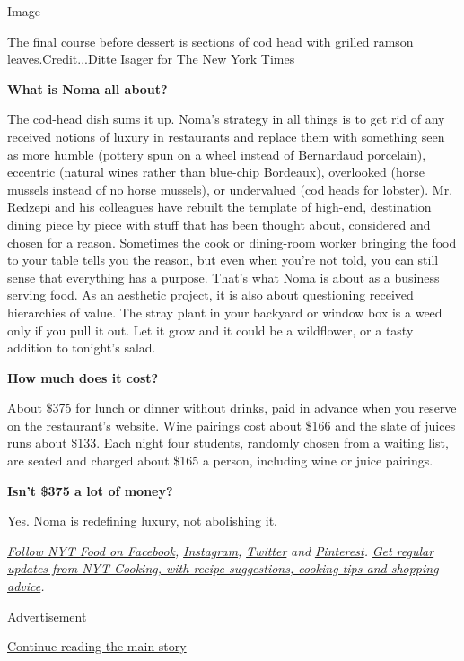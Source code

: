 Image

The final course before dessert is sections of cod head with grilled
ramson leaves.Credit...Ditte Isager for The New York Times

\textbf{What is Noma all about?}

The cod-head dish sums it up. Noma's strategy in all things is to get
rid of any received notions of luxury in restaurants and replace them
with something seen as more humble (pottery spun on a wheel instead of
Bernardaud porcelain), eccentric (natural wines rather than blue-chip
Bordeaux), overlooked (horse mussels instead of no horse mussels), or
undervalued (cod heads for lobster). Mr. Redzepi and his colleagues have
rebuilt the template of high-end, destination dining piece by piece with
stuff that has been thought about, considered and chosen for a reason.
Sometimes the cook or dining-room worker bringing the food to your table
tells you the reason, but even when you're not told, you can still sense
that everything has a purpose. That's what Noma is about as a business
serving food. As an aesthetic project, it is also about questioning
received hierarchies of value. The stray plant in your backyard or
window box is a weed only if you pull it out. Let it grow and it could
be a wildflower, or a tasty addition to tonight's salad.

\textbf{How much does it cost?}

About \$375 for lunch or dinner without drinks, paid in advance when you
reserve on the restaurant's website. Wine pairings cost about \$166 and
the slate of juices runs about \$133. Each night four students, randomly
chosen from a waiting list, are seated and charged about \$165 a person,
including wine or juice pairings.

\textbf{Isn't \$375 a lot of money?}

Yes. Noma is redefining luxury, not abolishing it.

\href{https://www.facebookcorewwwi.onion/nytfood/}{\emph{Follow NYT Food
on Facebook}}\emph{,}
\href{https://instagram.com/nytfood}{\emph{Instagram}}\emph{,}
\href{https://twitter.com/nytfood}{\emph{Twitter}} \emph{and}
\href{https://www.pinterest.com/nytfood/}{\emph{Pinterest}}\emph{.}
\href{https://www.nytimes3xbfgragh.onion/newsletters/cooking}{\emph{Get
regular updates from NYT Cooking, with recipe suggestions, cooking tips
and shopping advice}}\emph{.}

Advertisement

\protect\hyperlink{after-bottom}{Continue reading the main story}

